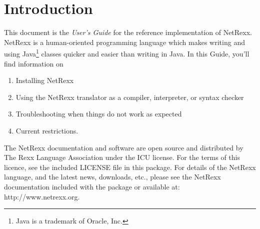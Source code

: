 \chapter{Introduction}
This document is the \emph{User’s Guide} for the reference implementation of
NetRexx. NetRexx is a human-oriented programming language which makes
writing and using Java\footnote{Java is a trademark of Oracle, Inc.} classes quicker and easier than writing in Java. 
In this Guide, you’ll find information on
\begin{enumerate} 
\item Installing NetRexx 
\item Using the NetRexx translator as a compiler, interpreter, or
  syntax checker 
\item Troubleshooting when things do not work as expected
\item Current restrictions.
\end{enumerate} 
The NetRexx documentation and software are open source and distributed by The Rexx Language Association under the \textsc{ICU} license. For the terms of this licence, see the included \textsc{LICENSE} file in this package.
For details of the NetRexx language, and the latest news, downloads, etc., please see the NetRexx documentation included with the package or available at: http://www.netrexx.org.
